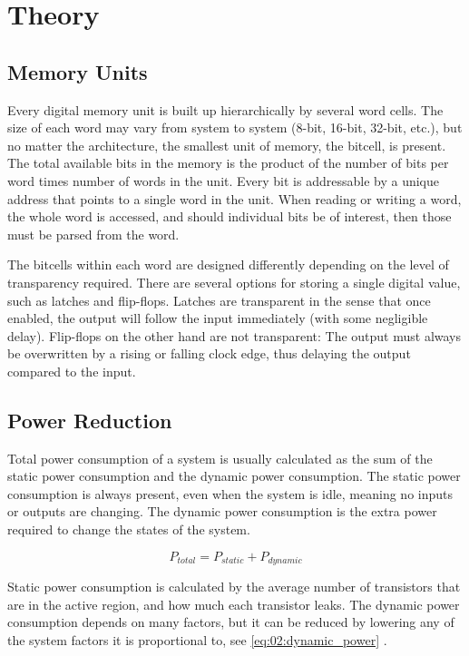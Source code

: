 \section{Theory}    \label{sec:02:theory}

\subsection{Memory Units}
Every digital memory unit is built up hierarchically by several word cells. The size of each word may vary from system to system (8-bit, 16-bit, 32-bit, etc.), but no matter the architecture, the smallest unit of memory, the bitcell, is present. The total available bits in the memory is the product of the number of bits per word times number of words in the unit. Every bit is addressable by a unique address that points to a single word in the unit. When reading or writing a word, the whole word is accessed, and should individual bits be of interest, then those must be parsed from the word.

The bitcells within each word are designed differently depending on the level of transparency required. There are several options for storing a single digital value, such as latches and flip-flops. Latches are transparent in the sense that once enabled, the output will follow the input immediately (with some negligible delay). Flip-flops on the other hand are not transparent: The output must always be overwritten by a rising or falling clock edge, thus delaying the output compared to the input.

\subsection{Power Reduction}
Total power consumption of a system is usually calculated as the sum of the static power consumption and the dynamic power consumption. The static power consumption is always present, even when the system is idle, meaning no inputs or outputs are changing. The dynamic power consumption is the extra power required to change the states of the system.

\begin{equation}
    P_{total} = P_{static} + P_{dynamic}
    \label{eq:02:total_power}
\end{equation}

Static power consumption is calculated by the average number of transistors that are in the active region, and how much each transistor leaks. The dynamic power consumption depends on many factors, but it can be reduced by lowering any of the system factors it is proportional to, see \autoref{eq:02:dynamic_power} \cite{forelesningslidesPower}.


